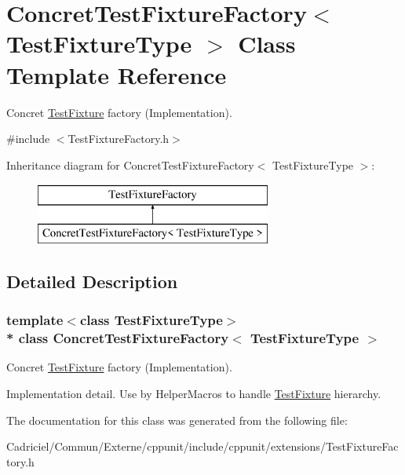 \hypertarget{class_concret_test_fixture_factory}{}\section{Concret\+Test\+Fixture\+Factory$<$ Test\+Fixture\+Type $>$ Class Template Reference}
\label{class_concret_test_fixture_factory}


Concret \hyperlink{class_test_fixture}{Test\+Fixture} factory (Implementation).  




{\ttfamily \#include $<$Test\+Fixture\+Factory.\+h$>$}

Inheritance diagram for Concret\+Test\+Fixture\+Factory$<$ Test\+Fixture\+Type $>$\+:\begin{figure}[H]
\begin{center}
\leavevmode
\includegraphics[height=2.000000cm]{class_concret_test_fixture_factory}
\end{center}
\end{figure}


\subsection{Detailed Description}
\subsubsection*{template$<$class Test\+Fixture\+Type$>$\\*
class Concret\+Test\+Fixture\+Factory$<$ Test\+Fixture\+Type $>$}

Concret \hyperlink{class_test_fixture}{Test\+Fixture} factory (Implementation). 

Implementation detail. Use by Helper\+Macros to handle \hyperlink{class_test_fixture}{Test\+Fixture} hierarchy. 

The documentation for this class was generated from the following file\+:\begin{DoxyCompactItemize}
\item 
Cadriciel/\+Commun/\+Externe/cppunit/include/cppunit/extensions/Test\+Fixture\+Factory.\+h\end{DoxyCompactItemize}
